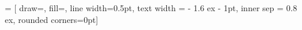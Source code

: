 % 

\renewcommand*{\glspostdescription}{}  %
\makeglossaries  %
\glstoctrue  %


\makeatletter
{} = [
draw=\@todonotes@currentbordercolor,
fill=\@todonotes@currentbackgroundcolor,
line width=0.5pt,
text width = \@todonotes@textwidth - 1.6 ex - 1pt,
inner sep = 0.8 ex,
rounded corners=0pt]
\makeatother






\usepackage{lineno}
\linenumbers
